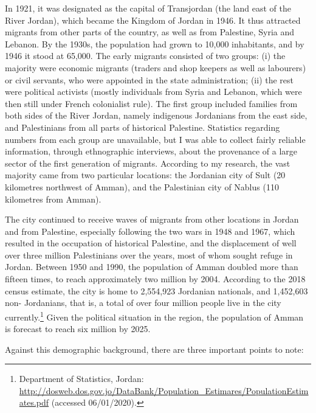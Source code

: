 \documentclass[output=paper]{langsci/langscibook}
\begin{document}
In 1921, it was designated as the capital of Transjordan (the land east of the River Jordan), which became the Kingdom of Jordan in 1946. It thus attracted migrants from other parts of the country, as well as from Palestine, Syria and Lebanon. By the 1930s, the population had grown to 10,000 inhabitants, and by 1946 it stood at 65,000. The early migrants consisted of two groups: (i) the majority were economic migrants (traders and shop keepers as well as labourers) or civil servants, who were appointed in the state administration; (ii) the rest were political activists (mostly individuals from Syria and Lebanon, which were then still under French colonialist rule). The first group included families from both sides of the River Jordan, namely indigenous Jordanians from the east side, and Palestinians from all parts of historical Palestine. Statistics regarding numbers from each group are unavailable, but I was able to collect fairly reliable information, through ethnographic interviews, about the provenance of a large sector of the first generation of migrants. According to my research, the vast majority came from two particular locations: the Jordanian city of Sult (20 kilometres northwest of Amman), and the Palestinian city of Nablus (110 kilometres from Amman).

The city continued to receive waves of migrants from other locations in Jordan and from Palestine, especially following the two wars in 1948 and 1967, which resulted in the occupation of historical Palestine, and the displacement of well over three million Palestinians over the years, most of whom sought refuge in Jordan. Between 1950 and 1990, the population of Amman doubled more than fifteen times, to reach approximately two million by 2004. According to the 2018 census estimate, the city is home to 2,554,923 Jordanian nationals, and 1,452,603 non- Jordanians, that is, a total of over four million people live in the city currently.\footnote{Department of Statistics, Jordan: \url{http://dosweb.dos.gov.jo/DataBank/Population_Estimares/PopulationEstimates.pdf} (accessed 06/01/2020).} Given the political situation in the region, the population of Amman is forecast to reach six million by 2025. 

Against this demographic background, there are three important points to note:
\end{document}
